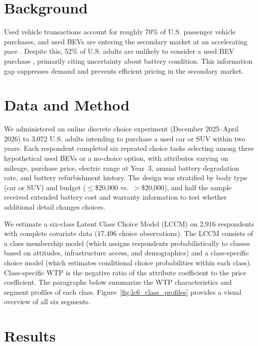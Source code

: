 \documentclass[12pt,a4paper]{extarticle}
\begin{document}
\section*{Background}

Used vehicle transactions account for roughly 70\% of U.S. passenger vehicle purchases, and used BEVs are entering the secondary market at an accelerating pace \parencite{coxautomotiveinc.EVMarketMonitor2025}. Despite this, 52\% of U.S. adults are unlikely to consider a used BEV purchase \parencite{fernandesUSUnderstandingConsumer2023}, primarily citing uncertainty about battery condition. This information gap suppresses demand and prevents efficient pricing in the secondary market.

\section*{Data and Method}

We administered an online discrete choice experiment (December 2025--April 2026) to 3,072 U.S. adults intending to purchase a used car or SUV within two years. Each respondent completed six repeated choice tasks selecting among three hypothetical used BEVs or a no-choice option, with attributes varying on mileage, purchase price, electric range at Year~3, annual battery degradation rate, and battery refurbishment history. The design was stratified by body type (car or SUV) and budget ($\leq$\$20,000 vs.\ $>$\$20,000), and half the sample received extended battery cost and warranty information to test whether additional detail changes choices.

We estimate a six-class Latent Class Choice Model (LCCM) on 2,916 respondents with complete covariate data (17,496 choice observations). The LCCM consists of a class membership model (which assigns respondents probabilistically to classes based on attitudes, infrastructure access, and demographics) and a class-specific choice model (which estimates conditional choice probabilities within each class). Class-specific WTP is the negative ratio of the attribute coefficient to the price coefficient. The paragraphs below summarize the WTP characteristics and segment profiles of each class. Figure~\ref{fig:lc6_class_profiles} provides a visual overview of all six segments.

\section*{Results}
\end{document}
